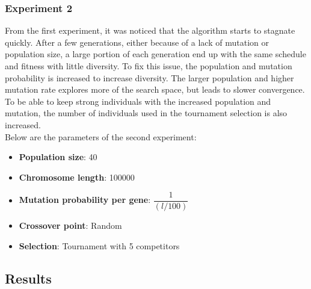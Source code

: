 \documentclass{article}
\newcommand{\n}[0]{\\[\baselineskip]}
\begin{document}
\subsubsection{Experiment 2}
From the first experiment, it was noticed that the algorithm starts to stagnate quickly. After a few generations, either because of a lack of mutation or population size, a large portion of each generation end up with the same schedule and fitness with little diversity. To fix this issue, the population and mutation probability is increased to increase diversity. The larger population and higher mutation rate explores more of the search space, but leads to slower convergence. To be able to keep strong individuals with the increased population and mutation, the number of individuals used in the tournament selection is also increased.
\n
Below are the parameters of the second experiment:
\begin{itemize}
\item \textbf{Population size}: 40
\item \textbf{Chromosome length}: 100000
\item \textbf{Mutation probability per gene}: $\dfrac{1}{(l/100)}$
\item \textbf{Crossover point}: Random
\item \textbf{Selection}: Tournament with 5 competitors
\end{itemize}

\subsection{Results}
\end{document}
